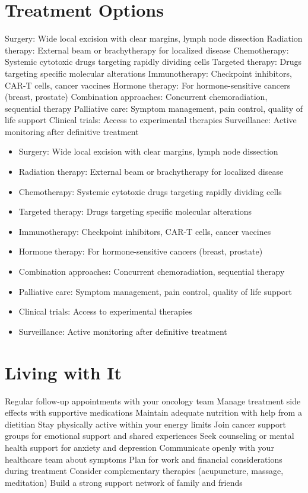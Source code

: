 \section{Treatment Options}
Surgery: Wide local excision with clear margins, lymph node dissection Radiation therapy: External beam or brachytherapy for localized disease Chemotherapy: Systemic cytotoxic drugs targeting rapidly dividing cells Targeted therapy: Drugs targeting specific molecular alterations Immunotherapy: Checkpoint inhibitors, CAR-T cells, cancer vaccines Hormone therapy: For hormone-sensitive cancers (breast, prostate) Combination approaches: Concurrent chemoradiation, sequential therapy Palliative care: Symptom management, pain control, quality of life support Clinical trials: Access to experimental therapies Surveillance: Active monitoring after definitive treatment

\begin{itemize}[noitemsep]
  \item Surgery: Wide local excision with clear margins, lymph node dissection
  \item Radiation therapy: External beam or brachytherapy for localized disease
  \item Chemotherapy: Systemic cytotoxic drugs targeting rapidly dividing cells
  \item Targeted therapy: Drugs targeting specific molecular alterations
  \item Immunotherapy: Checkpoint inhibitors, CAR-T cells, cancer vaccines
  \item Hormone therapy: For hormone-sensitive cancers (breast, prostate)
  \item Combination approaches: Concurrent chemoradiation, sequential therapy
  \item Palliative care: Symptom management, pain control, quality of life support
  \item Clinical trials: Access to experimental therapies
  \item Surveillance: Active monitoring after definitive treatment
\end{itemize}
\section{Living with It}
Regular follow-up appointments with your oncology team Manage treatment side effects with supportive medications Maintain adequate nutrition with help from a dietitian Stay physically active within your energy limits Join cancer support groups for emotional support and shared experiences Seek counseling or mental health support for anxiety and depression Communicate openly with your healthcare team about symptoms Plan for work and financial considerations during treatment Consider complementary therapies (acupuncture, massage, meditation) Build a strong support network of family and friends

